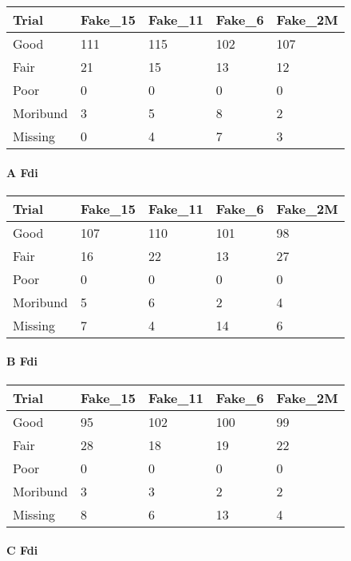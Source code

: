\documentclass[
]{article}
\begin{document}
\begin{tabular}{l|l|l|l|l}
\hline
Trial & Fake\_15 & Fake\_11 & Fake\_6 & Fake\_2M\\
\hline
Good & 111 & 115 & 102 & 107\\
\hline
Fair & 21 & 15 & 13 & 12\\
\hline
Poor & 0 & 0 & 0 & 0\\
\hline
Moribund & 3 & 5 & 8 & 2\\
\hline
Missing & 0 & 4 & 7 & 3\\
\hline
\end{tabular}

\hypertarget{a-fdi}{%
\paragraph{A Fdi}\label{a-fdi}}

\begin{tabular}{l|l|l|l|l}
\hline
Trial & Fake\_15 & Fake\_11 & Fake\_6 & Fake\_2M\\
\hline
Good & 107 & 110 & 101 & 98\\
\hline
Fair & 16 & 22 & 13 & 27\\
\hline
Poor & 0 & 0 & 0 & 0\\
\hline
Moribund & 5 & 6 & 2 & 4\\
\hline
Missing & 7 & 4 & 14 & 6\\
\hline
\end{tabular}

\hypertarget{b-fdi}{%
\paragraph{B Fdi}\label{b-fdi}}

\begin{tabular}{l|l|l|l|l}
\hline
Trial & Fake\_15 & Fake\_11 & Fake\_6 & Fake\_2M\\
\hline
Good & 95 & 102 & 100 & 99\\
\hline
Fair & 28 & 18 & 19 & 22\\
\hline
Poor & 0 & 0 & 0 & 0\\
\hline
Moribund & 3 & 3 & 2 & 2\\
\hline
Missing & 8 & 6 & 13 & 4\\
\hline
\end{tabular}

\hypertarget{c-fdi}{%
\paragraph{C Fdi}\label{c-fdi}}
\end{document}
